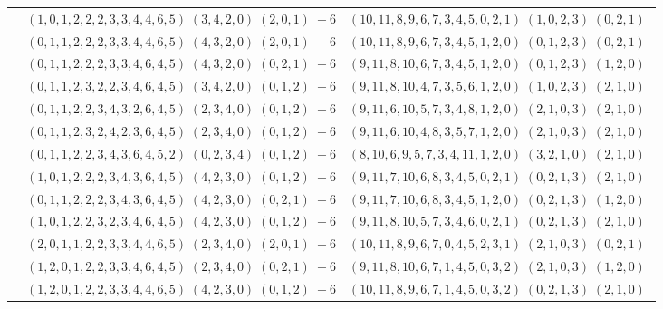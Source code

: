 \documentclass[11pt]{article}
\begin{document}
\begin{longtable}[l]{|c|c|c|}
 \cline{2-3} 
 & $(1 ,0 ,1 ,2 ,2 ,2 ,3 ,3 ,4 ,4 ,6 ,5) \;(3 ,4 ,2 ,0) \;(2 ,0 ,1) \;-6$ & $(10 ,11 ,8 ,9 ,6 ,7 ,3 ,4 ,5 ,0 ,2 ,1) \;(1 ,0 ,2 ,3) \;(0 ,2 ,1) \;$\\ 
 \cline{2-3} 
 & $(0 ,1 ,1 ,2 ,2 ,2 ,3 ,3 ,4 ,4 ,6 ,5) \;(4 ,3 ,2 ,0) \;(2 ,0 ,1) \;-6$ & $(10 ,11 ,8 ,9 ,6 ,7 ,3 ,4 ,5 ,1 ,2 ,0) \;(0 ,1 ,2 ,3) \;(0 ,2 ,1) \;$\\ 
 \cline{2-3} 
 & $(0 ,1 ,1 ,2 ,2 ,2 ,3 ,3 ,4 ,6 ,4 ,5) \;(4 ,3 ,2 ,0) \;(0 ,2 ,1) \;-6$ & $(9 ,11 ,8 ,10 ,6 ,7 ,3 ,4 ,5 ,1 ,2 ,0) \;(0 ,1 ,2 ,3) \;(1 ,2 ,0) \;$\\ 
 \cline{2-3} 
 & $(0 ,1 ,1 ,2 ,3 ,2 ,2 ,3 ,4 ,6 ,4 ,5) \;(3 ,4 ,2 ,0) \;(0 ,1 ,2) \;-6$ & $(9 ,11 ,8 ,10 ,4 ,7 ,3 ,5 ,6 ,1 ,2 ,0) \;(1 ,0 ,2 ,3) \;(2 ,1 ,0) \;$\\ 
 \cline{2-3} 
 & $(0 ,1 ,1 ,2 ,2 ,3 ,4 ,3 ,2 ,6 ,4 ,5) \;(2 ,3 ,4 ,0) \;(0 ,1 ,2) \;-6$ & $(9 ,11 ,6 ,10 ,5 ,7 ,3 ,4 ,8 ,1 ,2 ,0) \;(2 ,1 ,0 ,3) \;(2 ,1 ,0) \;$\\ 
 \cline{2-3} 
 & $(0 ,1 ,1 ,2 ,3 ,2 ,4 ,2 ,3 ,6 ,4 ,5) \;(2 ,3 ,4 ,0) \;(0 ,1 ,2) \;-6$ & $(9 ,11 ,6 ,10 ,4 ,8 ,3 ,5 ,7 ,1 ,2 ,0) \;(2 ,1 ,0 ,3) \;(2 ,1 ,0) \;$\\ 
 \cline{2-3} 
 & $(0 ,1 ,1 ,2 ,2 ,3 ,4 ,3 ,6 ,4 ,5 ,2) \;(0 ,2 ,3 ,4) \;(0 ,1 ,2) \;-6$ & $(8 ,10 ,6 ,9 ,5 ,7 ,3 ,4 ,11 ,1 ,2 ,0) \;(3 ,2 ,1 ,0) \;(2 ,1 ,0) \;$\\ 
 \cline{2-3} 
 & $(1 ,0 ,1 ,2 ,2 ,2 ,3 ,4 ,3 ,6 ,4 ,5) \;(4 ,2 ,3 ,0) \;(0 ,1 ,2) \;-6$ & $(9 ,11 ,7 ,10 ,6 ,8 ,3 ,4 ,5 ,0 ,2 ,1) \;(0 ,2 ,1 ,3) \;(2 ,1 ,0) \;$\\ 
 \cline{2-3} 
 & $(0 ,1 ,1 ,2 ,2 ,2 ,3 ,4 ,3 ,6 ,4 ,5) \;(4 ,2 ,3 ,0) \;(0 ,2 ,1) \;-6$ & $(9 ,11 ,7 ,10 ,6 ,8 ,3 ,4 ,5 ,1 ,2 ,0) \;(0 ,2 ,1 ,3) \;(1 ,2 ,0) \;$\\ 
 \cline{2-3} 
 & $(1 ,0 ,1 ,2 ,2 ,3 ,2 ,3 ,4 ,6 ,4 ,5) \;(4 ,2 ,3 ,0) \;(0 ,1 ,2) \;-6$ & $(9 ,11 ,8 ,10 ,5 ,7 ,3 ,4 ,6 ,0 ,2 ,1) \;(0 ,2 ,1 ,3) \;(2 ,1 ,0) \;$\\ 
 \cline{2-3} 
 & $(2 ,0 ,1 ,1 ,2 ,2 ,3 ,3 ,4 ,4 ,6 ,5) \;(2 ,3 ,4 ,0) \;(2 ,0 ,1) \;-6$ & $(10 ,11 ,8 ,9 ,6 ,7 ,0 ,4 ,5 ,2 ,3 ,1) \;(2 ,1 ,0 ,3) \;(0 ,2 ,1) \;$\\ 
 \cline{2-3} 
 & $(1 ,2 ,0 ,1 ,2 ,2 ,3 ,3 ,4 ,6 ,4 ,5) \;(2 ,3 ,4 ,0) \;(0 ,2 ,1) \;-6$ & $(9 ,11 ,8 ,10 ,6 ,7 ,1 ,4 ,5 ,0 ,3 ,2) \;(2 ,1 ,0 ,3) \;(1 ,2 ,0) \;$\\ 
 \cline{2-3} 
 & $(1 ,2 ,0 ,1 ,2 ,2 ,3 ,3 ,4 ,4 ,6 ,5) \;(4 ,2 ,3 ,0) \;(0 ,1 ,2) \;-6$ & $(10 ,11 ,8 ,9 ,6 ,7 ,1 ,4 ,5 ,0 ,3 ,2) \;(0 ,2 ,1 ,3) \;(2 ,1 ,0) \;$\\ 

\end{longtable}
\end{document}
